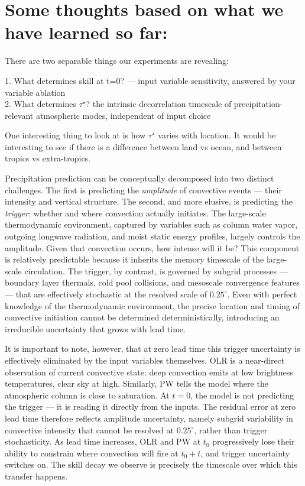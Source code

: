 \documentclass{article}
\begin{document}
\section{Some thoughts based on what we have learned so far:}


There are two separable things our experiments are revealing:

1. What determines skill at t=0? — input variable sensitivity, answered by your variable ablation \\
2. What determines $\tau^\star$?  the intrinsic decorrelation timescale of precipitation-relevant atmospheric modes, independent of input choice


One interesting thing to look at is how $\tau^\star$ varies with location. It would be interesting to see if there is a difference between land vs ocean, and between tropics vs extra-tropics. 


Precipitation prediction can be conceptually decomposed into two distinct challenges. The first is predicting the \textit{amplitude} of convective events --- their intensity and vertical structure. The second, and more elusive, is predicting the \textit{trigger}: whether and where convection actually initiates. The large-scale thermodynamic environment, captured by variables such as column water vapor, outgoing longwave radiation, and moist static energy profiles, largely controls the amplitude. Given that convection occurs, how intense will it be? This component is relatively predictable because it inherits the memory timescale of the large-scale circulation. The trigger, by contrast, is governed by subgrid processes --- boundary layer thermals, cold pool collisions, and mesoscale convergence features --- that are effectively stochastic at the resolved scale of $0.25^\circ$. Even with perfect knowledge of the thermodynamic environment, the precise location and timing of convective initiation cannot be determined deterministically, introducing an irreducible uncertainty that grows with lead time.

It is important to note, however, that at zero lead time this trigger uncertainty is effectively eliminated by the input variables themselves. OLR is a near-direct observation of current convective state: deep convection emits at low brightness temperatures, clear sky at high. Similarly, PW tells the model where the atmospheric column is close to saturation. At $t = 0$, the model is not predicting the trigger --- it is reading it directly from the inputs. The residual error at zero lead time therefore reflects amplitude uncertainty, namely subgrid variability in convective intensity that cannot be resolved at $0.25^\circ$, rather than trigger stochasticity. As lead time increases, OLR and PW at $t_0$ progressively lose their ability to constrain where convection will fire at $t_0 + t$, and trigger uncertainty switches on. The skill decay we observe is precisely the timescale over which this transfer happens.
\end{document}

